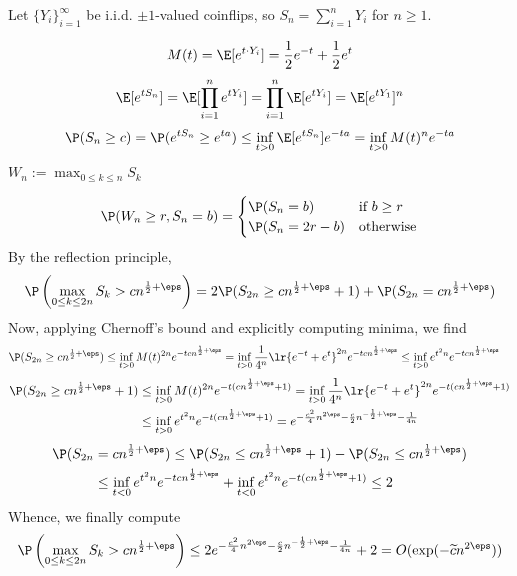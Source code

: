 \documentclass[12pt]{article}
\begin{document}
Let $ \{Y_{i}\}_{i=1}^{\infty} $ be i.i.d. $ \pm1 $-valued coinflips, so $ S_{n}= \sum_{i=1}^{n} Y_{i} $ for $ n\geq 1 $. 

\[
  M(t) = \E[e^{t\cdot Y_{i}}] = \frac{1}{2}e^{-t} +\frac{1}{2}e^{t}
\]
\[
  \E[e^{tS_{n}}] = \E[\prod_{i=1}^{n}e^{tY_{i}}] = \prod_{i=1}^{n}\E[e^{tY_{i}}] = \E[e^{tY_{1}}]^{n}
\]
\begin{align*}
  \P(S_{n}\geq c) = \P(e^{tS_{n}}\geq e^{ta}) \leq \inf_{t>0}\E[e^{tS_{n}}]e^{-ta} = \inf_{t>0}M(t)^{n}e^{-ta}
\end{align*}

$ W_{n}:=\max_{0\leq k\leq n} S_{k} $

\[
  \P(W_{n}\geq r, S_{n}=b) = \begin{cases}
    \P(S_{n}=b) & \text{if }b\geq r\\
    \P(S_{n}=2r-b) & \text{otherwise}
  \end{cases}
\]
By the reflection principle,
\begin{align*}
  \P\left(\max_{0\leq k\leq 2n}S_{k}>cn^{\frac{1}{2}+\eps}\right ) = 2\P(S_{2n}\geq cn^{\frac{1}{2}+\eps} + 1) + \P(S_{2n}= cn^{\frac{1}{2}+\eps})
\end{align*}
Now, applying Chernoff's bound and explicitly computing minima, we find
\begin{align*}
  \P(S_{2n}\geq cn^{\frac{1}{2}+\eps}) &\leq \inf_{t>0}M(t)^{2n}e^{-tcn^{\frac{1}{2}+\eps}}=\inf_{t>0}\frac{1}{4^{n}}\lr{e^{-t}+e^{t}}^{2n}e^{-tcn^{\frac{1}{2}+\eps}} \leq \inf_{t>0} e^{t^{2}n}e^{-tcn^{\frac{1}{2}+\eps}}
\end{align*}
\begin{align*}
  \P(S_{2n}\geq cn^{\frac{1}{2}+\eps}+1) &\leq \inf_{t>0}M(t)^{2n}e^{-t(cn^{\frac{1}{2}+\eps}+1)}=\inf_{t>0}\frac{1}{4^{n}}\lr{e^{-t}+e^{t}}^{2n}e^{-t(cn^{\frac{1}{2}+\eps}+1)}\\
&\leq \inf_{t>0} e^{t^{2}n}e^{-t(cn^{\frac{1}{2}+\eps}+1)} = e^{-\frac{c^{2}}{4}n^{2\eps} -\frac{c}{2}n^{-\frac{1}{2}+\eps}-\frac{1}{4n}}
\end{align*}
\begin{align*}
  \P(S_{2n} &= cn^{\frac{1}{2}+\eps})\leq \P(S_{2n}\leq cn^{\frac{1}{2}+\eps}+1) - \P(S_{2n}\leq cn^{\frac{1}{2}+\eps}) \\
  &\leq\inf_{t<0} e^{t^{2}n}e^{-tcn^{\frac{1}{2}+\eps}} +\inf_{t<0}e^{t^{2}n}e^{-t(cn^{\frac{1}{2}+\eps}+1)} \leq 2
\end{align*}
Whence, we finally compute
\begin{align*}
   \P\left(\max_{0\leq k\leq 2n}S_{k}>cn^{\frac{1}{2}+\eps} \right) \leq 2e^{-\frac{c^{2}}{4}n^{2\eps} -\frac{c}{2}n^{-\frac{1}{2}+\eps}-\frac{1}{4n}}+2 = O(\exp(-\widetilde{c}n^{2\eps}))
\end{align*}


\printbibliography
\end{document}
